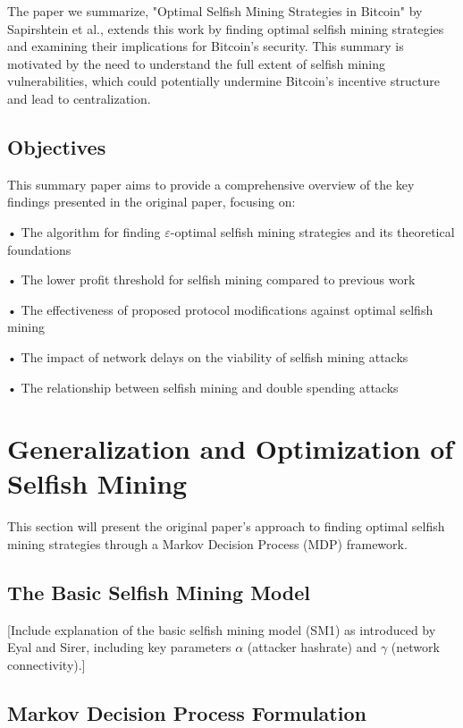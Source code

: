\documentclass[conference]{IEEEtran}
\begin{document}
The paper we summarize, "Optimal Selfish Mining Strategies in Bitcoin" by Sapirshtein et al., extends this work by finding optimal selfish mining strategies and examining their implications for Bitcoin's security. This summary is motivated by the need to understand the full extent of selfish mining vulnerabilities, which could potentially undermine Bitcoin's incentive structure and lead to centralization.

\subsection{Objectives}

This summary paper aims to provide a comprehensive overview of the key findings presented in the original paper, focusing on:

• The algorithm for finding $\varepsilon$-optimal selfish mining strategies and its theoretical foundations

• The lower profit threshold for selfish mining compared to previous work

• The effectiveness of proposed protocol modifications against optimal selfish mining

• The impact of network delays on the viability of selfish mining attacks

• The relationship between selfish mining and double spending attacks

\section{Generalization and Optimization of Selfish Mining}

This section will present the original paper's approach to finding optimal selfish mining strategies through a Markov Decision Process (MDP) framework.

\subsection{The Basic Selfish Mining Model}

[Include explanation of the basic selfish mining model (SM1) as introduced by Eyal and Sirer, including key parameters $\alpha$ (attacker hashrate) and $\gamma$ (network connectivity).]

\subsection{Markov Decision Process Formulation}
\end{document}
